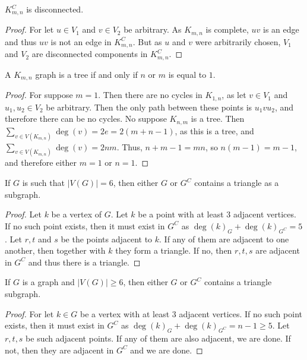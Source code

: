 \documentclass[crop=false,class=book,oneside]{standalone}
\begin{document}
        \begin{theorem}
        $K_{m,n}^C$ is disconnected.
        \end{theorem}
        \begin{proof}
        For let $u\in V_1$ and $v\in V_2$ be arbitrary. As $K_{m,n}$ is complete, $uv$ is an edge and thus $uv$ is not an edge in $K_{m,n}^C$. But as $u$ and $v$ were arbitrarily chosen, $V_1$ and $V_2$ are disconnected components in $K_{m,n}^C$.
        \end{proof}
        \begin{theorem}
        A $K_{m,n}$ graph is a tree if and only if $n$ or $m$ is equal to $1$.
        \end{theorem}
        \begin{proof}
        For suppose $m=1$. Then there are no cycles in $K_{1,n}$, as let $v\in V_1$ and $u_1,u_2\in V_2$ be arbitrary. Then the only path between these points is $u_1 v u_2$, and therefore there can be no cycles. No suppose $K_{n,m}$ is a tree. Then $\sum_{v\in V(K_{m,n})}\deg(v) = 2e=2(m+n-1)$, as this is a tree, and $\sum_{v\in V(K_{m,n})}\deg(v) = 2nm$. Thus, $n+m-1=mn$, so $n(m-1)=m-1$, and therefore either $m=1$ or $n=1$.
        \end{proof}
        \begin{theorem}
        If $G$ is such that $|V(G)|=6$, then either $G$ or $G^C$ contains a triangle as a subgraph.
        \end{theorem}
        \begin{proof}
        Let $k$ be a vertex of $G$. Let $k$ be a point with at least $3$ adjacent vertices. If no such point exists, then it must exist in $G^C$ as $\deg(k)_G+\deg(k)_{G^C}=5$. Let $r,t$ and $s$ be the points adjacent to $k$. If any of them are adjacent to one another, then together with $k$ they form a triangle. If no, then $r,t,s$ are adjacent in $G^C$ and thus there is a triangle.
        \end{proof}
        \begin{corollary}
        If $G$ is a graph and $|V(G)|\geq 6$, then either $G$ or $G^C$ contains a triangle subgraph.
        \end{corollary}
        \begin{proof}
        For let $k\in G$ be a vertex with at least $3$ adjacent vertices. If no such point exists, then it must exist in $G^C$ as $\deg(k)_G+\deg(k)_{G^C} = n-1 \geq 5$. Let $r,t,s$ be such adjacent points. If any of them are also adjacent, we are done. If not, then they are adjacent in $G^C$ and we are done.
        \end{proof}
\end{document}
